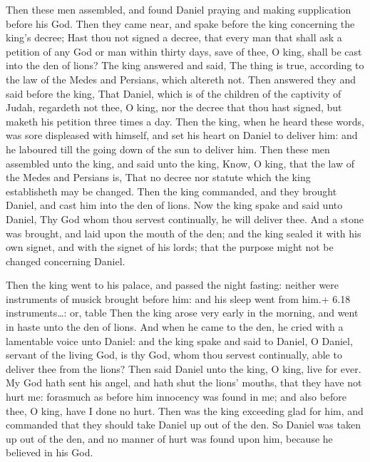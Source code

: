  Then these men assembled, and found Daniel praying and
making supplication before his God.  Then they came near,
and spake before the king concerning the king's decree; Hast thou not
signed a decree, that every man that shall ask a petition of any God or
man within thirty days, save of thee, O king, shall be cast into the den
of lions? The king answered and said, The thing is true, according to
the law of the Medes and Persians, which altereth not. 
Then answered they and said before the king, That Daniel, which is of
the children of the captivity of Judah, regardeth not thee, O king, nor
the decree that thou hast signed, but maketh his petition three times a
day.  Then the king, when he heard these words, was sore
displeased with himself, and set his heart on Daniel to deliver him: and
he laboured till the going down of the sun to deliver him. 
Then these men assembled unto the king, and said unto the king, Know, O
king, that the law of the Medes and Persians is, That no decree nor
statute which the king establisheth may be changed.  Then
the king commanded, and they brought Daniel, and cast him into the den
of lions. Now the king spake and said unto Daniel, Thy God whom thou
servest continually, he will deliver thee.  And a stone was
brought, and laid upon the mouth of the den; and the king sealed it with
his own signet, and with the signet of his lords; that the purpose might
not be changed concerning Daniel.

 Then the king went to his palace, and passed the night
fasting: neither were instruments of musick brought before him: and his
sleep went from him.+ 6.18 instruments\ldots: or, table 
Then the king arose very early in the morning, and went in haste unto
the den of lions.  And when he came to the den, he cried
with a lamentable voice unto Daniel: and the king spake and said to
Daniel, O Daniel, servant of the living God, is thy God, whom thou
servest continually, able to deliver thee from the lions? 
Then said Daniel unto the king, O king, live for ever.  My
God hath sent his angel, and hath shut the lions' mouths, that they have
not hurt me: forasmuch as before him innocency was found in me; and also
before thee, O king, have I done no hurt.  Then was the
king exceeding glad for him, and commanded that they should take Daniel
up out of the den. So Daniel was taken up out of the den, and no manner
of hurt was found upon him, because he believed in his God.

